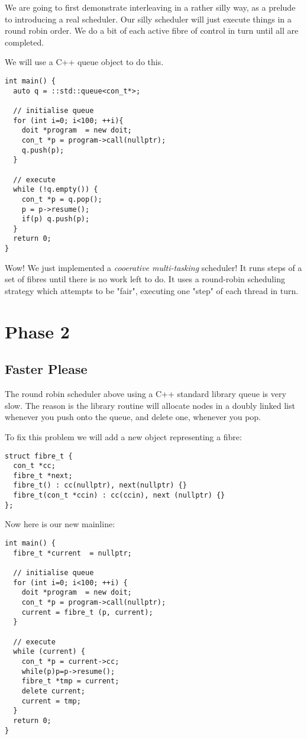 \documentclass[oneside]{book}
\begin{document}
We are going to first demonstrate interleaving in a rather silly way,
as a prelude to introducing a real scheduler. Our silly scheduler
will just execute things in a round robin order. We do a bit of each
active  fibre of control in turn until all are completed.

We will use a C++ queue object to do this.

\begin{verbatim}
int main() {
  auto q = ::std::queue<con_t*>;

  // initialise queue
  for (int i=0; i<100; ++i){
    doit *program  = new doit;
    con_t *p = program->call(nullptr);
    q.push(p);   
  }

  // execute
  while (!q.empty()) {
    con_t *p = q.pop();
    p = p->resume();
    if(p) q.push(p);
  }
  return 0;
}
\end{verbatim}

Wow! We just implemented a {\em cooerative multi-tasking} scheduler! It runs steps of a
set of fibres until there is no work left to do. It uses a round-robin
scheduling strategy which attempts to be "fair", executing one "step" 
of each thread in turn. 

\section{Phase 2}
\subsection{Faster Please}
The round robin scheduler above using a C++ standard library queue is very slow.
The reason is the library routine will allocate nodes in a doubly linked list
whenever you push onto the queue, and delete one, whenever you pop.

To fix this problem we will add a new object representing a fibre:

\begin{verbatim}
struct fibre_t {
  con_t *cc;
  fibre_t *next;
  fibre_t() : cc(nullptr), next(nullptr) {}
  fibre_t(con_t *ccin) : cc(ccin), next (nullptr) {}
};
\end{verbatim}

Now here is our new mainline:

\begin{verbatim}
int main() {
  fibre_t *current  = nullptr;

  // initialise queue
  for (int i=0; i<100; ++i) {
    doit *program  = new doit;
    con_t *p = program->call(nullptr);
    current = fibre_t (p, current);
  }

  // execute
  while (current) {
    con_t *p = current->cc;
    while(p)p=p->resume();
    fibre_t *tmp = current;
    delete current;
    current = tmp;
  }
  return 0;
}
\end{verbatim}
\end{document}
